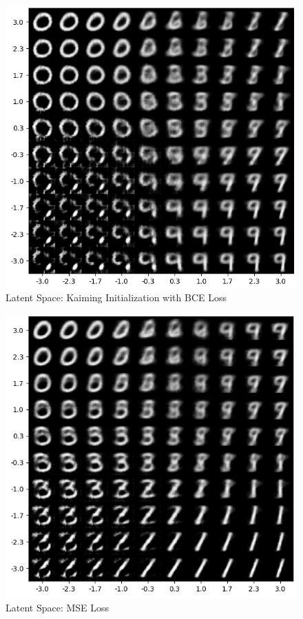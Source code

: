 \documentclass[12pt]{article}
\begin{document}
\begin{figure}[h]
\centering
\includegraphics[width=1\linewidth]{report_images/kaiming_init/latent_space.png}
\caption{\label{fig:latent_kaiming}Latent Space: Kaiming Initialization with BCE Loss}
\end{figure}

\begin{figure}[h]
\centering
\includegraphics[width=1\linewidth]{report_images/mse/latent_space.png}
\caption{\label{fig:latent_mse}Latent Space: MSE Loss}
\end{figure}
\end{document}
